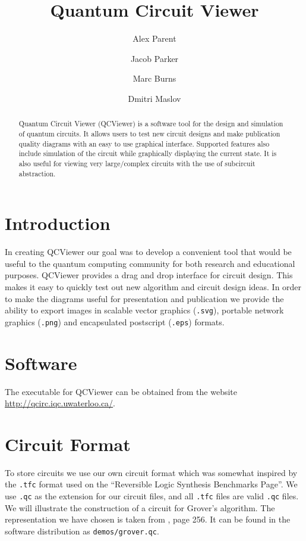\documentclass[a4paper,UKenglish]{lipics}
\title{Quantum Circuit Viewer}
\author[1]{Alex Parent}
\author[2]{Jacob Parker}
\author[3]{Marc Burns}
\author[4]{Dmitri Maslov}
\affil[1,2,3,4]{Institute for Quantum Computing, University of Waterloo, Waterloo, ON, Canada}
\affil[4]{National Science Foundation, Arlington, VA, USA}
\begin{document}
\maketitle

\begin{abstract}
Quantum Circuit Viewer (QCViewer) is a software tool for the design and simulation of quantum circuits.  
It allows users to test new circuit designs and make publication quality diagrams with an easy to use graphical interface.  
Supported features also include simulation of the circuit while graphically displaying the current state.
It is also useful for viewing very large/complex circuits with the use of subcircuit abstraction.
\end{abstract}

\section{Introduction}
In creating QCViewer our goal was to develop a convenient tool that would be useful to the quantum computing community for both research and educational purposes. 
QCViewer provides a drag and drop interface for circuit design.  
This makes it easy to quickly test out new algorithm and circuit design ideas.
In order to make the diagrams useful for presentation and publication we provide the ability to export images in scalable vector graphics (\verb+.svg+), portable network graphics (\verb+.png+) and encapsulated postscript (\verb+.eps+) formats.

\section{Software}
The executable for QCViewer can be obtained from the website \url{http://qcirc.iqc.uwaterloo.ca/}.

\section{Circuit Format}
To store circuits we use our own circuit format which was somewhat inspired by the \verb+.tfc+ format used on the ``Reversible Logic Synthesis Benchmarks Page''\cite{maslovBench}. We use \verb+.qc+ as the extension for our circuit files, and all \verb+.tfc+ files are valid \verb+.qc+ files.
We will illustrate the construction of a circuit for Grover's algorithm.  
The representation we have chosen is taken from \cite{nielsen2000quantum}, page 256.
It can be found in the software distribution as \verb+demos/grover.qc+.
\end{document}
